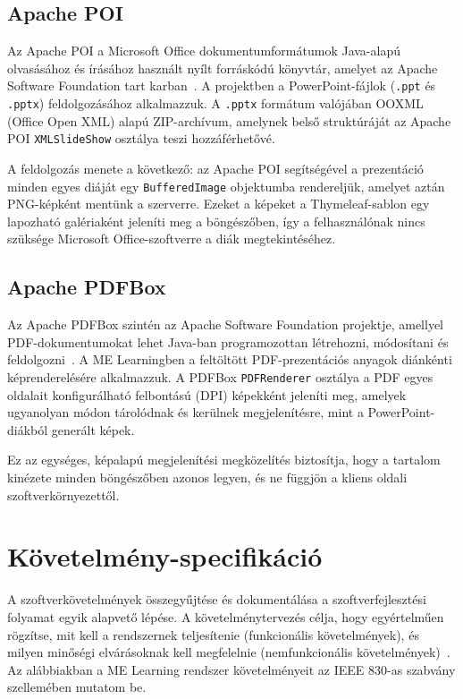\subsection{Apache POI}

Az Apache POI a Microsoft Office dokumentumformátumok Java-alapú olvasásához és írásához használt nyílt forráskódú könyvtár, amelyet az Apache Software Foundation tart karban~\cite{apache2023poi}. A projektben a PowerPoint-fájlok (\texttt{.ppt} és \texttt{.pptx}) feldolgozásához alkalmazzuk. A \texttt{.pptx} formátum valójában OOXML (Office Open XML) alapú ZIP-archívum, amelynek belső struktúráját az Apache POI \texttt{XMLSlideShow} osztálya teszi hozzáférhetővé.

A feldolgozás menete a következő: az Apache POI segítségével a prezentáció minden egyes diáját egy \texttt{BufferedImage} objektumba rendereljük, amelyet aztán PNG-képként mentünk a szerverre. Ezeket a képeket a Thymeleaf-sablon egy lapozható galériaként jeleníti meg a böngészőben, így a felhasználónak nincs szüksége Microsoft Office-szoftverre a diák megtekintéséhez.

\subsection{Apache PDFBox}

Az Apache PDFBox szintén az Apache Software Foundation projektje, amellyel PDF-dokumentumokat lehet Java-ban programozottan létrehozni, módosítani és feldolgozni~\cite{apache2023pdfbox}. A ME Learningben a feltöltött PDF-prezentációs anyagok diánkénti képrenderelésére alkalmazzuk. A PDFBox \texttt{PDFRenderer} osztálya a PDF egyes oldalait konfigurálható felbontású (DPI) képekként jeleníti meg, amelyek ugyanolyan módon tárolódnak és kerülnek megjelenítésre, mint a PowerPoint-diákból generált képek.

Ez az egységes, képalapú megjelenítési megközelítés biztosítja, hogy a tartalom kinézete minden böngészőben azonos legyen, és ne függjön a kliens oldali szoftverkörnyezettől.

\section{Követelmény-specifikáció}

A szoftverkövetelmények összegyűjtése és dokumentálása a szoftverfejlesztési folyamat egyik alapvető lépése. A követelménytervezés célja, hogy egyértelműen rögzítse, mit kell a rendszernek teljesítenie (funkcionális követelmények), és milyen minőségi elvárásoknak kell megfelelnie (nemfunkcionális követelmények)~\cite{sommerville2016software}. Az alábbiakban a ME Learning rendszer követelményeit az IEEE 830-as szabvány szellemében mutatom be.

